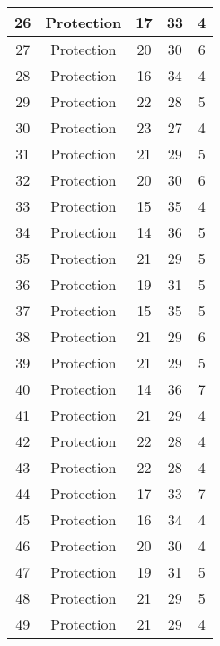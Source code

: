 \documentclass[results.tex]{subfiles}
\begin{document}
\begin{center}
\begin{tabular}{| c || c | c | c | c |}
    \hline
    26 & Protection & 17 & 33 & 4 \\ 
    \hline
    27 & Protection & 20 & 30 & 6 \\ 
    \hline
    28 & Protection & 16 & 34 & 4 \\ 
    \hline
    29 & Protection & 22 & 28 & 5 \\ 
    \hline
    30 & Protection & 23 & 27 & 4 \\ 
    \hline
    31 & Protection & 21 & 29 & 5 \\ 
    \hline
    32 & Protection & 20 & 30 & 6 \\ 
    \hline
    33 & Protection & 15 & 35 & 4 \\ 
    \hline
    34 & Protection & 14 & 36 & 5 \\ 
    \hline
    35 & Protection & 21 & 29 & 5 \\ 
    \hline
    36 & Protection & 19 & 31 & 5 \\ 
    \hline
    37 & Protection & 15 & 35 & 5 \\ 
    \hline
    38 & Protection & 21 & 29 & 6 \\ 
    \hline
    39 & Protection & 21 & 29 & 5 \\ 
    \hline
    40 & Protection & 14 & 36 & 7 \\ 
    \hline
    41 & Protection & 21 & 29 & 4 \\ 
    \hline
    42 & Protection & 22 & 28 & 4 \\ 
    \hline
    43 & Protection & 22 & 28 & 4 \\ 
    \hline
    44 & Protection & 17 & 33 & 7 \\ 
    \hline
    45 & Protection & 16 & 34 & 4 \\ 
    \hline
    46 & Protection & 20 & 30 & 4 \\ 
    \hline
    47 & Protection & 19 & 31 & 5 \\ 
    \hline
    48 & Protection & 21 & 29 & 5 \\ 
    \hline
    49 & Protection & 21 & 29 & 4 \\ 
    \hline   \end{tabular}
\end{center}
\end{document}
